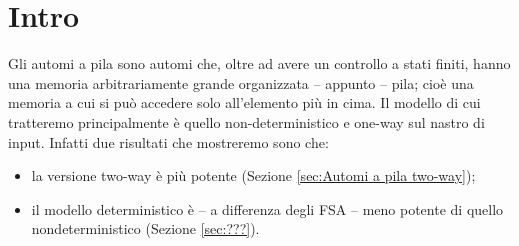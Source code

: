 \documentclass[12pt]{report}
\theoremstyle{definition}
\begin{document}
\tableofcontents
\newpage

\chapter{Intro}
Gli automi a pila sono automi che, oltre ad avere un controllo a stati finiti, hanno una memoria arbitrariamente grande organizzata -- appunto -- pila; cioè una memoria a cui si può accedere solo all'elemento più in cima.
Il modello di cui tratteremo principalmente è quello non-deterministico e one-way sul nastro di input.
Infatti due risultati che mostreremo sono che:
\begin{itemize}
	\item la versione two-way è più potente (Sezione \ref{sec:Automi a pila two-way});
	\item il modello deterministico è -- a differenza degli FSA -- meno potente di quello nondeterministico (Sezione \ref{sec:???}).
\end{itemize}
\end{document}
